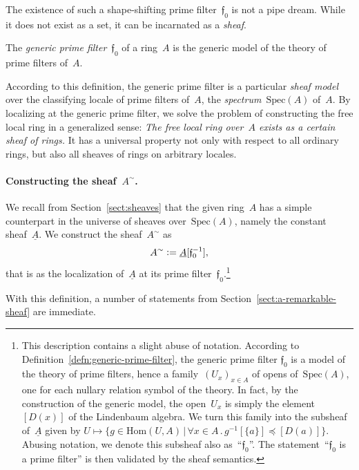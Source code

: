 \documentclass{ws-rv9x6}
\newcommand{\fff}{\mathfrak{f}}
\newcommand{\defeq}{\vcentcolon=}
\newcommand{\Hom}{\mathrm{Hom}}
\newcommand{\Spec}{\mathrm{Spec}}
\renewcommand{\_}{\mathpunct{.}}
\newcommand{\?}{\,{:}\,}
\begin{document}
The existence of such a shape-shifting prime filter~$\fff_0$ is not a pipe dream.
While it does not exist as a set, it can be incarnated as a \emph{sheaf}.

\begin{definition}\label{defn:generic-prime-filter}
The \emph{generic prime filter}~$\fff_0$ of a ring~$A$ is the
generic model of the theory of prime filters of~$A$.\end{definition}

According to this definition, the generic prime filter is a particular
\emph{sheaf model} over the classifying locale of prime filters of~$A$, the
\emph{spectrum}~$\Spec(A)$ of~$A$. By localizing at the generic prime filter, we solve
the problem of constructing the free local ring in a generalized sense: \emph{The
free local ring over~$A$ exists as a certain sheaf of rings.} It has a
universal property not only with respect to all ordinary rings, but also all
sheaves of rings on arbitrary locales.

\paragraph{Constructing the sheaf~$A^\sim$.} We recall from Section~\ref{sect:sheaves} that the given ring~$A$
has a simple counterpart in the universe of sheaves over~$\Spec(A)$, namely the
constant sheaf~$\underline{A}$. We construct the sheaf~$A^\sim$ as
\[ A^\sim \defeq \underline{A}[\fff_0^{-1}], \]
that is as the localization of~$\underline{A}$ at its prime
filter~$\fff_0$.\footnote{This description contains a slight abuse of notation.
According to Definition~\ref{defn:generic-prime-filter}, the generic prime
filter $\fff_0$ is a model of the theory of prime filters, hence a
family~$(U_x)_{x \in A}$ of opens of~$\Spec(A)$, one for each nullary relation
symbol of the theory. In fact, by the construction of the generic model, the
open~$U_x$ is simply the element~$[D(x)]$ of the Lindenbaum algebra. We
turn this family into the subsheaf of~$\underline{A}$ given by $U \mapsto \{ g
\in \Hom(U,A) \,|\, \forall x \in A\_ g^{-1}[\{a\}] \preceq [D(a)] \}$. Abusing
notation, we denote this subsheaf also as~``$\fff_0$''. The
statement~``$\fff_0$ is a prime filter'' is then validated by the sheaf semantics.}

With this definition, a number of statements from
Section~\ref{sect:a-remarkable-sheaf} are immediate.
\end{document}
